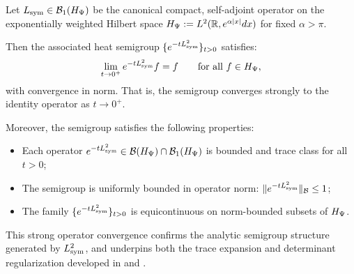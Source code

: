 \begin{proposition}
\label{prop:strong_op_closure_heat}
Let \( L_{\mathrm{sym}} \in \mathcal{B}_1(H_{\Psi}) \) be the canonical compact, self-adjoint operator on the exponentially weighted Hilbert space \( H_{\Psi} := L^2(\mathbb{R}, e^{\alpha |x|} dx) \) for fixed \( \alpha > \pi \).

Then the associated heat semigroup \( \{ e^{-t L_{\mathrm{sym}}^2} \}_{t > 0} \) satisfies:
\[
\lim_{t \to 0^+} e^{-t L_{\mathrm{sym}}^2} f = f \qquad \text{for all } f \in H_{\Psi},
\]
with convergence in norm. That is, the semigroup converges strongly to the identity operator as \( t \to 0^+ \).

\medskip
\noindent
Moreover, the semigroup satisfies the following properties:
\begin{itemize}
    \item Each operator \( e^{-t L_{\mathrm{sym}}^2} \in \mathcal{B}(H_{\Psi}) \cap \mathcal{B}_1(H_{\Psi}) \) is bounded and trace class for all \( t > 0 \);
    \item The semigroup is uniformly bounded in operator norm: \( \| e^{-t L_{\mathrm{sym}}^2} \|_{\mathcal{B}} \le 1 \);
    \item The family \( \{ e^{-t L_{\mathrm{sym}}^2} \}_{t > 0} \) is equicontinuous on norm-bounded subsets of \( H_{\Psi} \).
\end{itemize}

\medskip
\noindent
This strong operator convergence confirms the analytic semigroup structure generated by \( L_{\mathrm{sym}}^2 \), and underpins both the trace expansion and determinant regularization developed in  and .
\end{proposition}
